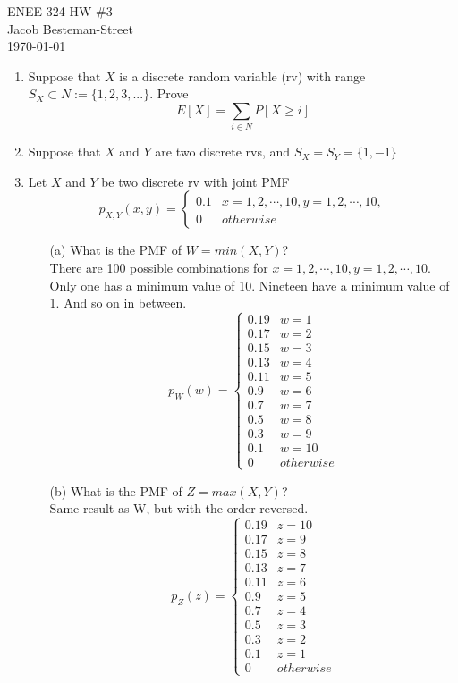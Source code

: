 \documentclass{report}
\begin{document}
ENEE 324 HW \#3 \\
Jacob Besteman-Street \\
\today \\
\begin{enumerate}
\item Suppose that $X$ is a discrete random variable (rv) with range $ S_X \subset N := \{1,2,3, ... \}$. Prove
$$ E[X] = \sum_{i \in N} P[X \geq i]$$

\item Suppose that $X$ and $Y$ are two discrete rvs, and $ S_X = S_Y = \{1,-1\}$

\item Let $X$ and $Y$ be two discrete rv with joint PMF
$$ p_{X,Y}(x,y) = \left. \begin{cases}
0.1 & x = 1, 2, \cdots , 10, y = 1, 2, \cdots , 10, \\
0 & otherwise
\end{cases} \right.$$
\begin{itemize}
\item[(a)] What is the PMF of $W = min(X,Y)$? \\
There are 100 possible combinations for $x = 1, 2, \cdots , 10, y = 1, 2, \cdots , 10$. Only one has a minimum value of 10. Nineteen have a minimum value of 1. And so on in between.
$$ p_W(w) = \left. \begin{cases}
0.19 & w = 1 \\
0.17 & w = 2 \\
0.15 & w = 3 \\
0.13 & w = 4 \\
0.11 & w = 5 \\
0.9 & w = 6 \\
0.7 & w = 7 \\
0.5 & w = 8 \\
0.3 & w = 9 \\
0.1 & w = 10 \\
0 & otherwise
\end{cases} \right.$$
\item[(b)] What is the PMF of $Z = max(X,Y)$?\\
Same result as W, but with the order reversed.
$$ p_Z(z) = \left. \begin{cases}
0.19 & z = 10 \\
0.17 & z = 9 \\
0.15 & z = 8 \\
0.13 & z = 7 \\
0.11 & z = 6 \\
0.9 & z = 5 \\
0.7 & z = 4 \\
0.5 & z = 3 \\
0.3 & z = 2 \\
0.1 & z = 1 \\
0 & otherwise
\end{cases} \right.$$
\end{itemize}


\end{enumerate}

 
\end{document}
